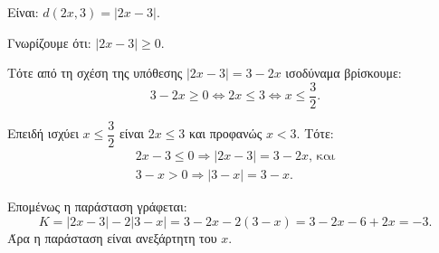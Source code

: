
\begin{alist}
\item Είναι:
$d(2x, 3) = |2x - 3|$.

Γνωρίζουμε ότι:
$|2x - 3| \ge 0$.

Τότε από τη σχέση της υπόθεσης $|2x - 3| = 3 - 2x$ ισοδύναμα βρίσκουμε:
\[3 - 2x \ge 0 \Leftrightarrow 2x \le 3 \Leftrightarrow x \le \dfrac{3}{2}.\]

\item Επειδή ισχύει $x \le \dfrac{3}{2}$ είναι $2x \le 3$ και προφανώς $x < 3$. Τότε:
\begin{gather*}
2x - 3 \le 0 \Rightarrow |2x - 3| = 3 - 2x\text{, και} \\
3 - x > 0 \Rightarrow |3 - x| = 3 - x.
\end{gather*}

Επομένως η παράσταση γράφεται:
\[K = |2x - 3| - 2|3 - x| = 3 - 2x - 2(3 - x) = 3 - 2x - 6 + 2x = -3.\]
Άρα η παράσταση είναι ανεξάρτητη του $x$.
\end{alist}

